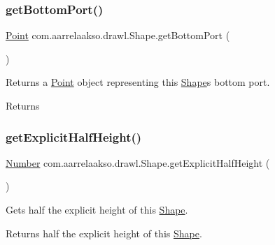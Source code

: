 \subsubsection{\texorpdfstring{get\+Bottom\+Port()}{getBottomPort()}}
{\footnotesize\ttfamily \hyperlink{classcom_1_1aarrelaakso_1_1drawl_1_1_point}{Point} com.\+aarrelaakso.\+drawl.\+Shape.\+get\+Bottom\+Port (\begin{DoxyParamCaption}{ }\end{DoxyParamCaption})}



Returns a \hyperlink{classcom_1_1aarrelaakso_1_1drawl_1_1_point}{Point} object representing this \hyperlink{classcom_1_1aarrelaakso_1_1drawl_1_1_shape}{Shape}\textquotesingle{}s bottom port. 

\begin{DoxyReturn}{Returns}

\end{DoxyReturn}
\mbox{\label{classcom_1_1aarrelaakso_1_1drawl_1_1_shape_a10833aa0e7e8ef7b45c866ccf6d419e5}} 
\subsubsection{\texorpdfstring{get\+Explicit\+Half\+Height()}{getExplicitHalfHeight()}}
{\footnotesize\ttfamily \hyperlink{interfacecom_1_1aarrelaakso_1_1drawl_1_1_number}{Number} com.\+aarrelaakso.\+drawl.\+Shape.\+get\+Explicit\+Half\+Height (\begin{DoxyParamCaption}{ }\end{DoxyParamCaption})\hspace{0.3cm}{\ttfamily [private]}}



Gets half the explicit height of this \hyperlink{classcom_1_1aarrelaakso_1_1drawl_1_1_shape}{Shape}. 

\begin{DoxyReturn}{Returns}
half the explicit height of this \hyperlink{classcom_1_1aarrelaakso_1_1drawl_1_1_shape}{Shape}. 
\end{DoxyReturn}
\mbox{\label{classcom_1_1aarrelaakso_1_1drawl_1_1_shape_a3acdc2fd1944e2efacd0bfbb8aefe89b}} 
